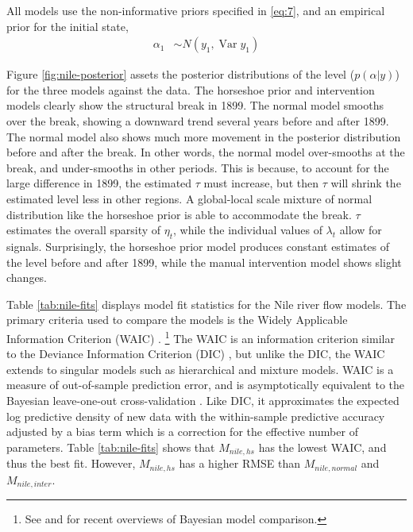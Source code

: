 \documentclass{article}
\DeclareMathOperator{\Var}{Var}
\begin{document}
All models use the non-informative priors specified in \eqref{eq:7}, and an empirical prior for the initial state,
\begin{align}
  \label{eq:13}
  \alpha_{1} &\sim N(y_{1}, \Var y_{1})
\end{align}

Figure \ref{fig:nile-posterior} assets the posterior distributions of the level ($p(\alpha | y)$) for the three models against the data.
The horseshoe prior and intervention models clearly show the structural break in 1899. 
The normal model smooths over the break, showing a downward trend several years before and after 1899. 
The normal model also shows much more movement in the posterior distribution before and after the break.
In other words, the normal model over-smooths at the break, and under-smooths in other periods.
This is because, to account for the large difference in 1899, the estimated $\tau$ must increase, but then $\tau$ will shrink the estimated level less in other regions.
A global-local scale mixture of normal distribution like the horseshoe prior is able to accommodate the break.
$\tau$ estimates the overall sparsity of $\eta_{t}$, while the individual values of $\lambda_{t}$ allow for signals.
Surprisingly, the horseshoe prior model produces constant estimates of the level before and after 1899, while the manual intervention model shows slight changes.

Table \ref{tab:nile-fits} displays model fit statistics for the Nile river flow models.
The primary criteria used to compare the models is the Widely Applicable Information Criterion (WAIC) \parencite{Watanabe2010}.%
\footnote{See \textcite{GelmanHwangVehtari2013} and \textcite{VehtariOjanen2012} for recent overviews of Bayesian model comparison.}
The WAIC is an information criterion similar to the Deviance Information Criterion (DIC) \parencite{spiegelhalter2002bayes}, but unlike the DIC, the WAIC extends to singular models such as hierarchical and mixture models.
WAIC is a measure of out-of-sample prediction error, and is asymptotically equivalent to the Bayesian leave-one-out cross-validation \parencite{Watanabe2010}.
Like DIC, it approximates the expected log predictive density of new data with the within-sample predictive accuracy adjusted by a bias term which is a correction for the effective number of parameters.
Table \ref{tab:nile-fits} shows that $M_{nile,hs}$ has the lowest WAIC, and thus the best fit.
However, $M_{nile,hs}$ has a higher RMSE than $M_{nile,normal}$ and $M_{nile,inter}$.
\end{document}
